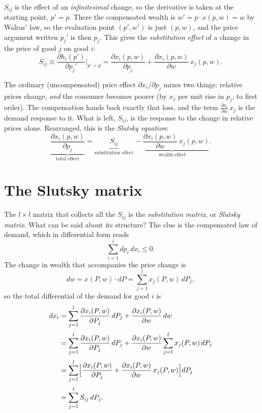 \documentclass[11pt]{article}
\begin{document}
$S_{ij}$ is the effect of an \emph{infinitesimal} change, so the derivative is taken
at the starting point, $p'=p$. There the compensated wealth is
$w'=p\cdot x(p,w)=w$ by Walras' law, so the evaluation point $(p',w')$ is just
$(p,w)$, and the price argument written $p_j'$ is then $p_j$. This gives the
\emph{substitution effect} of a change in the price of good $j$ on good $i$:
\[
  S_{ij}\equiv
  \frac{\partial h_i(p')}{\partial p_j'}\bigg|_{p'=p}
  =\frac{\partial x_i(p,w)}{\partial p_j}
   +\frac{\partial x_i(p,w)}{\partial w}\,x_j(p,w).
\]

The ordinary (uncompensated) price effect $\partial x_i/\partial p_j$ mixes two
things: relative prices change, \emph{and} the consumer becomes poorer (by $x_j$ per
unit rise in $p_j$, to first order). The compensation hands back exactly that loss,
and the term $\frac{\partial x_i}{\partial w}\,x_j$ is the demand response to it.
What is left, $S_{ij}$, is the response to the change in relative prices alone.
Rearranged, this is the \emph{Slutsky equation}:
\[
  \underbrace{\frac{\partial x_i(p,w)}{\partial p_j}}_{\text{total effect}}
  =\underbrace{S_{ij}}_{\text{substitution effect}}
   \;\underbrace{-\;\frac{\partial x_i(p,w)}{\partial w}\,x_j(p,w)}_{\text{wealth effect}} .
\]

\section{The Slutsky matrix}

The $l\times l$ matrix that collects all the $S_{ij}$ is the \emph{substitution
matrix}, or \emph{Slutsky matrix}. What can be said about its structure? The clue is
the compensated law of demand, which in differential form reads
\[ \sum_{i=1}^{l} dp_i\,dx_i\le 0 . \]
The change in wealth that accompanies the price change is
\[ dw=x(P,w)\cdot dP=\sum_{j=1}^{l}x_j(P,w)\,dP_j , \]
so the total differential of the demand for good $i$ is
\[
\begin{aligned}
  dx_i&=\sum_{j=1}^{l}\frac{\partial x_i(P,w)}{\partial P_j}\,dP_j
        +\frac{\partial x_i(P,w)}{\partial w}\,dw\\[2pt]
      &=\sum_{j=1}^{l}\frac{\partial x_i(P,w)}{\partial P_j}\,dP_j
        +\frac{\partial x_i(P,w)}{\partial w}\sum_{j=1}^{l}x_j(P,w)\,dP_j\\[2pt]
      &=\sum_{j=1}^{l}\Bigl[\frac{\partial x_i(P,w)}{\partial P_j}
        +\frac{\partial x_i(P,w)}{\partial w}\,x_j(P,w)\Bigr]dP_j\\[2pt]
      &=\sum_{j=1}^{l}S_{ij}\,dP_j .
\end{aligned}
\]
\end{document}
